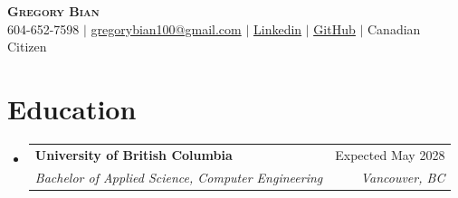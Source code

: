 \documentclass[letterpaper,11pt]{article}
\makeatletter
\newcommand{\resumeSubheading}[4]{
  \vspace{-2pt}\item
    \begin{tabular*}{0.97\textwidth}[t]{l@{\extracolsep{\fill}}r}
      \textbf{#1} & #2 \\
      \textit{\small#3} & \textit{\small #4} \\
    \end{tabular*}\vspace{-7pt}
}
\newcommand{\resumeSubHeadingListStart}{\begin{itemize}[leftmargin=0.15in, label={}]}
\makeatother
\begin{document}

\begin{center}
    \textbf{\Huge \scshape Gregory Bian} \\ \vspace{1pt}
    \small 604-652-7598 $|$ \href{mailto:gregorybian100@gmail.com}{gregorybian100@gmail.com} $|$ 
     \href{https://www.linkedin.com/in/gregorybian/}{\underline{Linkedin}} $|$
     \href{https://github.com/gregorybian}{\underline{GitHub}} $|$
    \small Canadian Citizen
\end{center}
\section{Education}
  \resumeSubHeadingListStart
    \resumeSubheading
      {University of British Columbia}{Expected May 2028}
      {Bachelor of Applied Science, Computer Engineering}{Vancouver, BC}
   \end{itemize}


\end{document}
